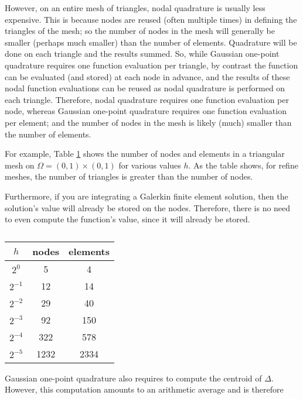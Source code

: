 \documentclass[12pt]{amsart}
\begin{document}
However, on an entire mesh of triangles, nodal quadrature is usually less
expensive. This is because nodes are reused (often multiple times) in defining
the triangles of the mesh; so the number of nodes in the mesh will generally be
smaller (perhaps much smaller) than the number of elements. Quadrature will be
done on each triangle and the results summed. So, while Gaussian one-point
quadrature requires one function evaluation per triangle, by contrast the
function can be evaluated (and stored) at each node in advance, and the results
of these nodal function evaluations can be reused as nodal quadrature is
performed on each triangle. Therefore, nodal quadrature requires one function
evaluation per node, whereas Gaussian one-point quadrature requires one
function evaluation per element; and the number of nodes in the mesh is likely
(much) smaller than the number of elements.

For example, Table \ref{tab:1} shows the number of nodes and elements in a
triangular mesh on $\Omega = (0,1) \times (0,1)$ for various values $h$. As the
table shows, for refine meshes, the number of triangles is greater than the
number of nodes. 

Furthermore, if you are integrating a Galerkin finite element solution, then
the solution's value will already be stored on the nodes. Therefore, there is
no need to even compute the function's value, since it will already be stored. 

%
\begin{table}[]
    \centering
    \begin{tabular}{c c c}
    \hline
		$h$ & nodes & elements \\
	\hline
		$2^0$		& 5    & 4    \\
		$2^{-1}$	& 12   & 14   \\
		$2^{-2}$	& 29   & 40   \\
		$2^{-3}$	& 92   & 150  \\
		$2^{-4}$	& 322  & 578  \\
		$2^{-5}$	& 1232 & 2334 \\
	\hline
    \end{tabular}
    \caption{}
    \label{tab:1}
\end{table}
%




Gaussian one-point quadrature
also requires to compute the centroid of $\Delta$. However, this computation
amounts to an arithmetic average and is therefore 
\end{document}
